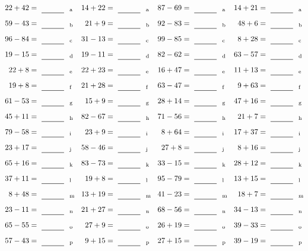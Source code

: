 \documentclass
[
  draft    = true,
  fontsize = 11pt,
  parskip  = half-
]
{scrartcl}
\begin{document}
\clearpage
\begin{align*}
    \pline{22+42}&=\rline{a}
  & \pline{14+22}&=\rline{a}
  & \pline{87-69}&=\rline{a}
  & \pline{14+21}&=\rline{a} \\[1ex]
    \pline{59-43}&=\rline{b}
  & \pline{21+9}&=\rline{b}
  & \pline{92-83}&=\rline{b}
  & \pline{48+6}&=\rline{b} \\[1ex]
    \pline{96-84}&=\rline{c}
  & \pline{31-13}&=\rline{c}
  & \pline{99-85}&=\rline{c}
  & \pline{8+28}&=\rline{c} \\[1ex]
    \pline{19-15}&=\rline{d}
  & \pline{19-11}&=\rline{d}
  & \pline{82-62}&=\rline{d}
  & \pline{63-57}&=\rline{d} \\[1ex]
    \pline{22+8}&=\rline{e}
  & \pline{22+23}&=\rline{e}
  & \pline{16+47}&=\rline{e}
  & \pline{11+13}&=\rline{e} \\[1ex]
    \pline{19+8}&=\rline{f}
  & \pline{21+28}&=\rline{f}
  & \pline{63-47}&=\rline{f}
  & \pline{9+63}&=\rline{f} \\[1ex]
    \pline{61-53}&=\rline{g}
  & \pline{15+9}&=\rline{g}
  & \pline{28+14}&=\rline{g}
  & \pline{47+16}&=\rline{g} \\[1ex]
    \pline{45+11}&=\rline{h}
  & \pline{82-67}&=\rline{h}
  & \pline{71-56}&=\rline{h}
  & \pline{21+7}&=\rline{h} \\[1ex]
    \pline{79-58}&=\rline{i}
  & \pline{23+9}&=\rline{i}
  & \pline{8+64}&=\rline{i}
  & \pline{17+37}&=\rline{i} \\[1ex]
    \pline{23+17}&=\rline{j}
  & \pline{58-46}&=\rline{j}
  & \pline{27+8}&=\rline{j}
  & \pline{8+16}&=\rline{j} \\[1ex]
    \pline{65+16}&=\rline{k}
  & \pline{83-73}&=\rline{k}
  & \pline{33-15}&=\rline{k}
  & \pline{28+12}&=\rline{k} \\[1ex]
    \pline{37+11}&=\rline{l}
  & \pline{19+8}&=\rline{l}
  & \pline{95-79}&=\rline{l}
  & \pline{13+15}&=\rline{l} \\[1ex]
    \pline{8+48}&=\rline{m}
  & \pline{13+19}&=\rline{m}
  & \pline{41-23}&=\rline{m}
  & \pline{18+7}&=\rline{m} \\[1ex]
    \pline{23-11}&=\rline{n}
  & \pline{21+27}&=\rline{n}
  & \pline{68-56}&=\rline{n}
  & \pline{34-13}&=\rline{n} \\[1ex]
    \pline{65-55}&=\rline{o}
  & \pline{27+9}&=\rline{o}
  & \pline{26+19}&=\rline{o}
  & \pline{39-33}&=\rline{o} \\[1ex]
    \pline{57-43}&=\rline{p}
  & \pline{9+15}&=\rline{p}
  & \pline{27+15}&=\rline{p}
  & \pline{39-19}&=\rline{p}
\end{align*}
\end{document}
